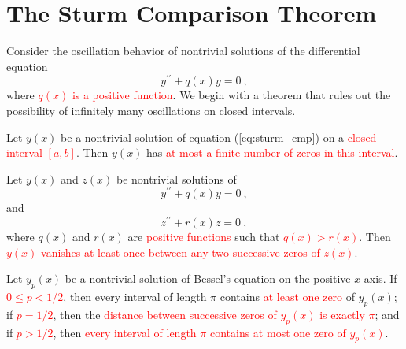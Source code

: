 \documentclass[12pt,a4paper]{article}
\newcounter{theo}[section]\setcounter{theo}{0}
\begin{document}
\section{The Sturm Comparison Theorem}
\cite{george1991differential, simmons2016differential} Consider the oscillation behavior of nontrivial
solutions of the differential equation
\begin{equation}
y^{\prime \prime} +q(x) y = 0 ~,
\label{eq:sturm_cmp}
\end{equation}
where \textcolor{red}{$q(x)$ is a positive function}. We begin with a theorem that rules out the possibility of infinitely many oscillations on closed intervals. 
\begin{tcolorbox}[colback=green!5,colframe=green!40!black,title= Theorem A]
Let $y(x)$ be a nontrivial solution of equation (\ref{eq:sturm_cmp}) on a \textcolor{red}{closed interval $[a, b]$}. Then $y(x)$ has \textcolor{red}{at most a finite number of zeros in this interval}.
\end{tcolorbox}









\begin{tcolorbox}[colback=green!5,colframe=green!40!black,title= Theorem B]
Let $y(x)$ and $z(x)$ be nontrivial solutions of
\begin{equation}
y^{\prime \prime} +q(x) y = 0 ~,
\end{equation}
and
\begin{equation}
z^{\prime \prime} +r(x) z = 0 ~,
\end{equation}
where $q(x)$ and $r(x)$ are \textcolor{red}{positive functions} such that \textcolor{red}{$q(x) > r(x)$}. Then \textcolor{red}{$y(x)$ vanishes at least once between any two successive zeros of $z(x)$}.
\end{tcolorbox}


\begin{tcolorbox}[colback=green!5,colframe=green!40!black,title= Theorem C]
Let $y_p(x)$ be a nontrivial solution of Bessel's equation on the positive $x$-axis. If \textcolor{red}{$0 \leqslant p < 1/2$}, then every interval of length $\pi$ contains \textcolor{red}{at least one zero} of $y_p(x)$; if \textcolor{red}{$p = 1/2$}, then the \textcolor{red}{distance between successive zeros of $y_p(x)$ is exactly $\pi$}; and if \textcolor{red}{$p > 1/2$}, then \textcolor{red}{every interval of length $\pi$ contains at most one zero of $y_p(x)$}.
\end{tcolorbox}
\end{document}
